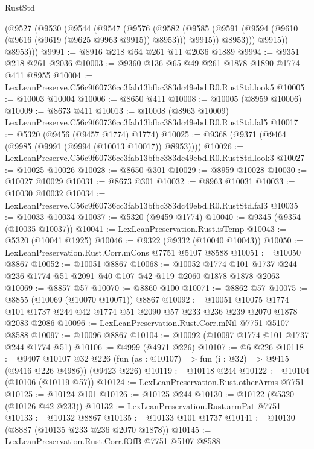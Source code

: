 \begin{lexlean}{RustStd}
\begin{coremodule}
        (@9527
          (@9530
            (@9544
              (@9547
                (@9576
                  (@9582
                    (@9585 (@9591 (@9594 (@9610 (@9616 (@9619 (@9625 @9963 @9915)) @8953))) @9915))
                    @8953)))
              @9915))
          @8953)))
@9991 := @8916 @218 @64 @261 @11 @2036 @1889
@9994 := @9351 @218 @261 @2036
@10003 := @9360 @136 @65 @49 @261 @1878 @1890 @1774 @411 @8955
@10004 := LexLeanPreserve.C56c9f60736cc3fab13bfbc383dc49ebd.R0.RustStd.look5
@10005 := @10003 @10004
@10006 := @8650 @411
@10008 := @10005 (@8959 @10006)
@10009 := @8673 @411
@10013 := @10008 (@8963 @10009) LexLeanPreserve.C56c9f60736cc3fab13bfbc383dc49ebd.R0.RustStd.fal5
@10017 := @5320 (@9456 (@9457 @1774) @1774)
@10025 := @9368 (@9371 (@9464 (@9985 (@9991 (@9994 (@10013 @10017)) @8953))))
@10026 := LexLeanPreserve.C56c9f60736cc3fab13bfbc383dc49ebd.R0.RustStd.look3
@10027 := @10025 @10026
@10028 := @8650 @301
@10029 := @8959 @10028
@10030 := @10027 @10029
@10031 := @8673 @301
@10032 := @8963 @10031
@10033 := @10030 @10032
@10034 := LexLeanPreserve.C56c9f60736cc3fab13bfbc383dc49ebd.R0.RustStd.fal3
@10035 := @10033 @10034
@10037 := @5320 (@9459 @1774)
@10040 := @9345 (@9354 (@10035 @10037))
@10041 := LexLeanPreservation.Rust.isTemp
@10043 := @5320 (@10041 @1925)
@10046 := @9322 (@9332 (@10040 @10043))
@10050 := LexLeanPreservation.Rust.Corr.mCons @7751 @5107 @8588
@10051 := @10050 @8867
@10052 := @10051 @8867
@10068 := @10052
    @1774
    @101
    @1737
    @244
    @236
    @1774
    @51
    @2091
    @40
    @107
    @42
    @119
    @2060
    @1878
    @1878
    @2063
@10069 := @8857 @57
@10070 := @8860 @100
@10071 := @8862 @57
@10075 := @8855 (@10069 (@10070 @10071)) @8867
@10092 := @10051
    @10075
    @1774
    @101
    @1737
    @244
    @42
    @1774
    @51
    @2090
    @57
    @233
    @236
    @239
    @2070
    @1878
    @2083
    @2086
@10096 := LexLeanPreservation.Rust.Corr.mNil @7751 @5107 @8588
@10097 := @10096 @8867
@10104 := @10092 (@10097 @1774 @101 @1737 @244 @1774 @51)
@10106 := @4999 (@4971 @226)
@10107 := @6 @226
@10118 := @9407
    @10107
    @32
    @226
    (fun (as : @10107) => fun (i : @32) => @9415 (@9416 @226 @4986))
    (@9423 @226)
@10119 := @10118 @244
@10122 := @10104 (@10106 (@10119 @57))
@10124 := LexLeanPreservation.Rust.otherArms @7751
@10125 := @10124 @101
@10126 := @10125 @244
@10130 := @10122 (@5320 (@10126 @42 @233))
@10132 := LexLeanPreservation.Rust.armPat @7751
@10133 := @10132 @8867
@10135 := @10133 @101 @1737
@10141 := @10130 (@8887 (@10135 @233 @236 @2070 @1878))
@10145 := LexLeanPreservation.Rust.Corr.fOfB @7751 @5107 @8588

\end{coremodule}
\end{lexlean}
